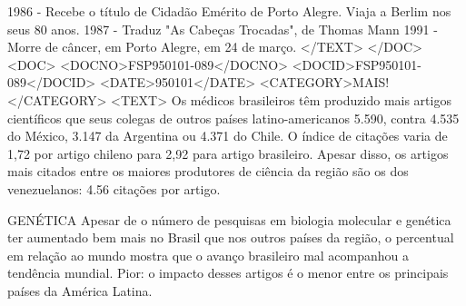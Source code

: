 1986 - Recebe o título de Cidadão Emérito de Porto Alegre. Viaja a Berlim nos seus 80 anos.
1987 - Traduz "As Cabeças Trocadas", de Thomas Mann
1991 - Morre de câncer, em Porto Alegre, em 24 de março.
</TEXT>
</DOC>
<DOC>
<DOCNO>FSP950101-089</DOCNO>
<DOCID>FSP950101-089</DOCID>
<DATE>950101</DATE>
<CATEGORY>MAIS!</CATEGORY>
<TEXT>
Os médicos brasileiros têm produzido mais artigos científicos que seus colegas de outros países latino-americanos 5.590, contra 4.535 do México, 3.147 da Argentina ou 4.371 do Chile. O índice de citações varia de 1,72 por artigo chileno para 2,92 para artigo brasileiro. Apesar disso, os artigos mais citados entre os maiores produtores de ciência da região são os dos venezuelanos: 4.56 citações por artigo.

GENÉTICA 
Apesar de o número de pesquisas em biologia molecular e genética ter aumentado bem mais no Brasil que nos outros países da região, o percentual em relação ao mundo mostra que o avanço brasileiro mal acompanhou a tendência mundial. Pior: o impacto desses artigos é o menor entre os principais países da América Latina.

